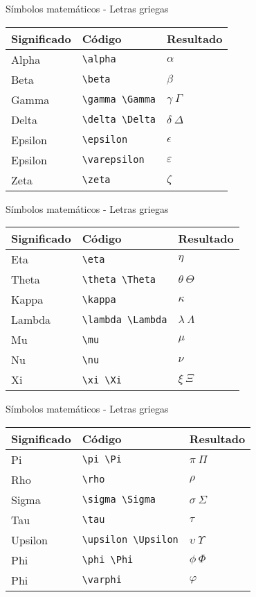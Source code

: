 \documentclass[ignorenonframetext,]{beamer}
\begin{document}
\begin{frame}[fragile]{Símbolos matemáticos - Letras griegas}
\protect\hypertarget{simbolos-matematicos---letras-griegas}{}

\begin{longtable}[]{@{}lll@{}}
\toprule
Significado & Código & Resultado\tabularnewline
\midrule
\endhead
Alpha & \texttt{\textbackslash{}alpha} & \(\alpha\)\tabularnewline
Beta & \texttt{\textbackslash{}beta} & \(\beta\)\tabularnewline
Gamma & \texttt{\textbackslash{}gamma\ \textbackslash{}Gamma} &
\(\gamma\  \Gamma\)\tabularnewline
Delta & \texttt{\textbackslash{}delta\ \textbackslash{}Delta} &
\(\delta\  \Delta\)\tabularnewline
Epsilon & \texttt{\textbackslash{}epsilon} & \(\epsilon\)\tabularnewline
Epsilon & \texttt{\textbackslash{}varepsilon} &
\(\varepsilon\)\tabularnewline
Zeta & \texttt{\textbackslash{}zeta} & \(\zeta\)\tabularnewline
\bottomrule
\end{longtable}

\end{frame}

\begin{frame}[fragile]{Símbolos matemáticos - Letras griegas}
\protect\hypertarget{simbolos-matematicos---letras-griegas-1}{}

\begin{longtable}[]{@{}lll@{}}
\toprule
Significado & Código & Resultado\tabularnewline
\midrule
\endhead
Eta & \texttt{\textbackslash{}eta} & \(\eta\)\tabularnewline
Theta & \texttt{\textbackslash{}theta\ \textbackslash{}Theta} &
\(\theta\ \Theta\)\tabularnewline
Kappa & \texttt{\textbackslash{}kappa} & \(\kappa\)\tabularnewline
Lambda & \texttt{\textbackslash{}lambda\ \textbackslash{}Lambda} &
\(\lambda\  \Lambda\)\tabularnewline
Mu & \texttt{\textbackslash{}mu} & \(\mu\)\tabularnewline
Nu & \texttt{\textbackslash{}nu} & \(\nu\)\tabularnewline
Xi & \texttt{\textbackslash{}xi\ \textbackslash{}Xi} &
\(\xi\ \Xi\)\tabularnewline
\bottomrule
\end{longtable}

\end{frame}

\begin{frame}[fragile]{Símbolos matemáticos - Letras griegas}
\protect\hypertarget{simbolos-matematicos---letras-griegas-2}{}

\begin{longtable}[]{@{}lll@{}}
\toprule
Significado & Código & Resultado\tabularnewline
\midrule
\endhead
Pi & \texttt{\textbackslash{}pi\ \textbackslash{}Pi} &
\(\pi\ \Pi\)\tabularnewline
Rho & \texttt{\textbackslash{}rho} & \(\rho\)\tabularnewline
Sigma & \texttt{\textbackslash{}sigma\ \textbackslash{}Sigma} &
\(\sigma\ \Sigma\)\tabularnewline
Tau & \texttt{\textbackslash{}tau} & \(\tau\)\tabularnewline
Upsilon & \texttt{\textbackslash{}upsilon\ \textbackslash{}Upsilon} &
\(\upsilon\ \Upsilon\)\tabularnewline
Phi & \texttt{\textbackslash{}phi\ \textbackslash{}Phi} &
\(\phi\ \Phi\)\tabularnewline
Phi & \texttt{\textbackslash{}varphi} & \(\varphi\)\tabularnewline
\bottomrule
\end{longtable}

\end{frame}
\end{document}

